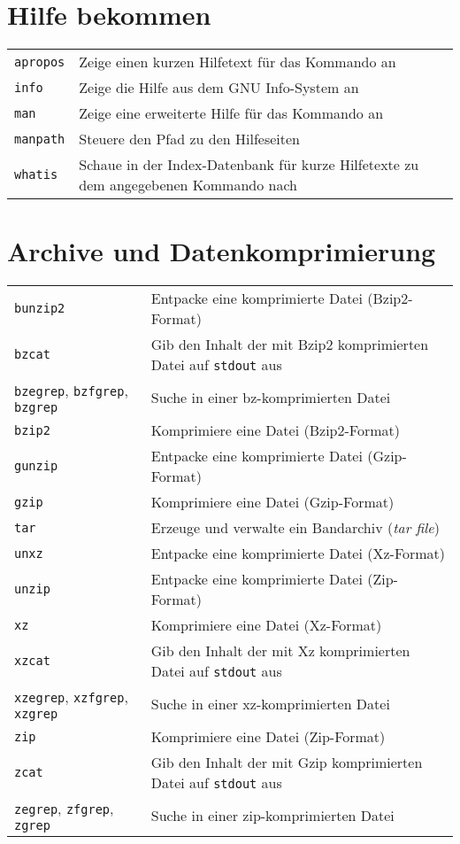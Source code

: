 \documentclass[10pt,a4paper]{article}
\begin{document}
\begin{multicols}{2}

\section{Hilfe bekommen\phantom{g}}
\begin{tabular}{ p{2.5cm} p{8.5cm} }
  \hline
  \texttt{apropos} & Zeige einen kurzen Hilfetext für das Kommando an \\
  \texttt{info} & Zeige die Hilfe aus dem GNU Info-System an\\
  \texttt{man} & Zeige eine erweiterte Hilfe für das Kommando an \\
  \texttt{manpath} & Steuere den Pfad zu den Hilfeseiten \\
  \texttt{whatis} & Schaue in der Index-Datenbank für kurze Hilfetexte zu dem angegebenen Kommando nach \\
  \hline
\end{tabular}

\section{Archive und Datenkomprimierung}
\begin{tabular}{ p{2.5cm} p{8.5cm} }
  \hline 
  \texttt{bunzip2} & Entpacke eine komprimierte Datei (Bzip2-Format) \\
  \texttt{bzcat} & Gib den Inhalt der mit Bzip2 kompri\-mierten Datei auf \texttt{stdout} aus\\
  \texttt{bzegrep}, \texttt{bzfgrep}, \texttt{bzgrep} & Suche in einer bz-komprimierten Datei \\
  \texttt{bzip2} & Komprimiere eine Datei (Bzip2-Format) \\
  \texttt{gunzip} & Entpacke eine komprimierte Datei (Gzip-Format) \\
  \texttt{gzip} & Komprimiere eine Datei (Gzip-Format) \\
  \texttt{tar} & Erzeuge und verwalte ein Bandarchiv (\textit{tar file}) \\
  \texttt{unxz} & Entpacke eine komprimierte Datei (Xz-Format) \\
  \texttt{unzip} & Entpacke eine komprimierte Datei (Zip-Format) \\
  \texttt{xz} & Komprimiere eine Datei (Xz-Format) \\
  \texttt{xzcat} & Gib den Inhalt der mit Xz komprimierten Datei auf \texttt{stdout} aus \\
  \texttt{xzegrep}, \texttt{xzfgrep}, \texttt{xzgrep} & Suche in einer xz-komprimierten Datei \\
  \texttt{zip} & Komprimiere eine Datei (Zip-Format) \\
  \texttt{zcat} & Gib den Inhalt der mit Gzip kompri\-mierten Datei auf \texttt{stdout} aus \\
  \texttt{zegrep}, \texttt{zfgrep}, \texttt{zgrep} & Suche in einer zip-komprimierten Datei \\
  \hline
\end{tabular}



\end{multicols}
\end{document}
